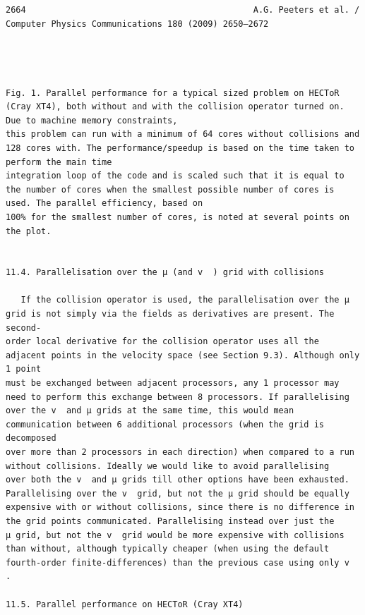 \documentclass[a4paper]{article}
\newcommand{\gkwpagefont}{\fontsize{6.0pt}{7.55pt}\selectfont}
\begin{document}
\begin{Verbatim}[fontsize=\gkwpagefont]
2664                                             A.G. Peeters et al. / Computer Physics Communications 180 (2009) 2650–2672




Fig. 1. Parallel performance for a typical sized problem on HECToR (Cray XT4), both without and with the collision operator turned on. Due to machine memory constraints,
this problem can run with a minimum of 64 cores without collisions and 128 cores with. The performance/speedup is based on the time taken to perform the main time
integration loop of the code and is scaled such that it is equal to the number of cores when the smallest possible number of cores is used. The parallel efficiency, based on
100% for the smallest number of cores, is noted at several points on the plot.


11.4. Parallelisation over the μ (and v  ) grid with collisions

   If the collision operator is used, the parallelisation over the μ grid is not simply via the fields as derivatives are present. The second-
order local derivative for the collision operator uses all the adjacent points in the velocity space (see Section 9.3). Although only 1 point
must be exchanged between adjacent processors, any 1 processor may need to perform this exchange between 8 processors. If parallelising
over the v  and μ grids at the same time, this would mean communication between 6 additional processors (when the grid is decomposed
over more than 2 processors in each direction) when compared to a run without collisions. Ideally we would like to avoid parallelising
over both the v  and μ grids till other options have been exhausted. Parallelising over the v  grid, but not the μ grid should be equally
expensive with or without collisions, since there is no difference in the grid points communicated. Parallelising instead over just the
μ grid, but not the v  grid would be more expensive with collisions than without, although typically cheaper (when using the default
fourth-order finite-differences) than the previous case using only v  .

11.5. Parallel performance on HECToR (Cray XT4)


\end{Verbatim}
\end{document}
